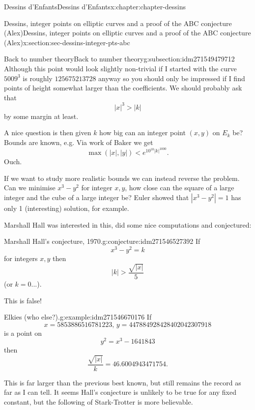 \documentclass[oneside,10pt,]{book}
\numberwithin{equation}{section}
\newcommand{\lt}{<}
\newcommand{\gt}{>}
\begin{document}
\begin{chapterptx}{Dessins d'Enfants}{}{Dessins d'Enfants}{}{}{x:chapter:chapter-dessins}
\begin{sectionptx}{Dessins, integer points on elliptic curves and a proof of the ABC conjecture (Alex)}{}{Dessins, integer points on elliptic curves and a proof of the ABC conjecture (Alex)}{}{}{x:section:sec-dessins-integer-pts-abc}
\begin{subsectionptx}{Back to number theory}{}{Back to number theory}{}{}{g:subsection:idm271549479712}
Although this point would look slightly non-trivial if I started with the curve \(5009^3\) is roughly \(125675213728\) anyway so you should only be impressed if I find points of height somewhat larger than the coefficients. We should probably ask that%
\begin{equation*}
|x|^3 \gt |k|
\end{equation*}
by some margin at least.%
\par
A nice question is then given \(k\) how big can an integer point \((x,y)\) on \(E_k\) be? Bounds are known, e.g.  Via work of Baker we get%
\begin{equation*}
\max(|x|, |y|) \lt e^{10^{10}|k|^{1000}}\text{.}
\end{equation*}
Ouch.%
\par
If we want to study more realistic bounds we can instead reverse the problem. Can we minimise \(x^3 - y^2\) for integer \(x,y\), how close can the square of a large integer and the cube of a large integer be? Euler showed that \(|x^3 - y^2| = 1\) has only 1 (interesting) solution, for example.%
\par
Marshall Hall was interested in this, did some nice computations and conjectured:%
\begin{conjecture}{Marshall Hall's conjecture, 1970.}{}{g:conjecture:idm271546527392}%
If%
\begin{equation*}
x^3 - y^2 = k
\end{equation*}
for integers \(x,y\) then%
\begin{equation*}
|k| \gt \frac{\sqrt{|x|}}{5}
\end{equation*}
(or \(k =0\)...).%
\end{conjecture}
This is false!%
\begin{example}{Elkies (who else?).}{g:example:idm271546670176}%
If%
\begin{equation*}
x= 5853886516781223,\,y = 447884928428402042307918
\end{equation*}
is a point on%
\begin{equation*}
y^2 = x^3 - 1641843
\end{equation*}
then%
\begin{equation*}
\frac{\sqrt{|x|}}{k} = 46.6004943471754\text{.}
\end{equation*}
%
\end{example}
This is far larger than the previous best known, but still remains the record as far as I can tell. It seems Hall's conjecture is unlikely to be true for any fixed constant, but the following of Stark-Trotter is more believable.%

\end{subsectionptx}
\end{sectionptx}
\end{chapterptx}
\end{document}
